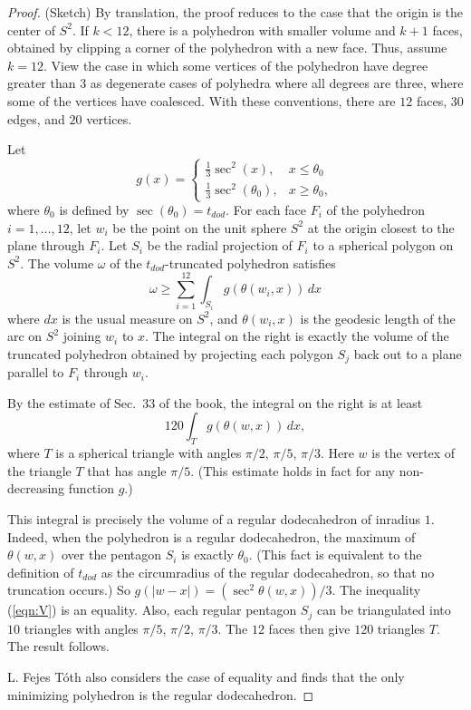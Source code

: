 \documentclass{article} %
\begin{document}
\begin{proof} (Sketch)  By translation, the proof reduces to
the case that the origin is the center of $S^2$.
If $k<12$, there is a polyhedron with smaller volume and $k+1$ faces,
obtained by clipping a corner of the polyhedron with a new face.
Thus, assume $k=12$.  
View the case in which some vertices of the polyhedron
have degree greater than $3$ as degenerate cases of polyhedra 
where all degrees are three, where some of the vertices have
coalesced.   With these conventions, 
there are $12$ faces, $30$ edges,
and $20$ vertices.

Let 
  $$g(x) = \begin{cases}
          \frac13 \sec^2 (x), & x \le \theta_0\\
          \frac13 \sec^2 (\theta_0), & x \ge \theta_0,
          \end{cases}
   $$
where $\theta_0$ is defined by $\sec(\theta_0) = t_{dod}$.
For each face $F_i$ of the polyhedron $i=1,\ldots, 12$, 
let $w_i$ be the point 
on the unit sphere $S^2$ at the origin closest to the plane through $F_i$.
Let $S_i$ be the radial projection of $F_i$ to a spherical polygon
on $S^2$.   The volume $\omega$ of the $t_{dod}$-truncated polyhedron satisfies
    \begin{equation}\label{eqn:V}
    \omega \ge \sum_{i=1}^{12} \int_{S_i} g(\theta(w_i,x))\,dx
    \end{equation}
where $dx$ is the usual measure on $S^2$,
and $\theta(w_i,x)$ is the geodesic length of the arc on $S^2$ joining
$w_i$ to $x$. The integral on the
right is exactly the volume of the truncated polyhedron obtained
by projecting each polygon $S_j$ back out to a plane parallel to $F_i$
through $w_i$.

By the estimate of Sec.~33 of the book, 
the integral on the right is at least
   $$
   120 \int_{T} g(\theta(w,x))\, dx,
   $$
where $T$ is a spherical triangle with angles $\pi/2$,
$\pi/5$, $\pi/3$.  Here $w$ is the vertex of the triangle $T$
that has angle $\pi/5$.  (This estimate 
holds in fact for any non-decreasing function $g$.)

This integral is precisely the volume of a regular
dodecahedron of inradius $1$.  Indeed, when the polyhedron
is a regular dodecahedron,  the maximum of $\theta(w,x)$ over the pentagon 
$S_i$ is exactly $\theta_0$.  (This fact is equivalent to the definition of $t_{dod}$ as the circumradius of the regular
dodecahedron, so that no truncation occurs.)
So $g(|w-x|) = (\sec^2\theta(w,x))/3$.  The inequality (\ref{eqn:V})
is an equality.  Also, each regular pentagon $S_j$ can be triangulated
into $10$ triangles with angles $\pi/5$, $\pi/2$, $\pi/3$.  The
$12$ faces then give $120$ triangles $T$.  The result follows.

L. Fejes T\'oth also considers the case of equality and finds that
the only minimizing polyhedron is the regular dodecahedron.
\end{proof}
\end{document}
